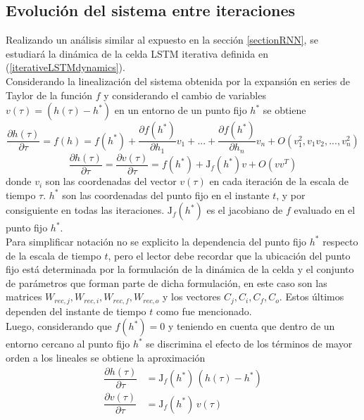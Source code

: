 \documentclass{article}
\begin{document}
	\subsection{Evolución del sistema entre iteraciones}
	Realizando un análisis similar al expuesto en la sección \ref{sectionRNN}, se estudiará la dinámica de la celda LSTM iterativa definida en (\ref{iterativeLSTMdynamics}).\\
	Considerando la linealización del sistema obtenida por la expansión en series de Taylor de la función $f$ y considerando el cambio de variables $v(\tau) = (h(\tau) - h^*)$ en un entorno de un punto fijo $h^*$ se obtiene
	\begin{equation*}
	\dfrac{\partial h(\tau)}{\partial \tau} = f(h) = f(h^*) + \dfrac{\partial f(h^*)}{\partial h_1} v_1+ ... + \dfrac{\partial f(h^*)}{\partial h_n} v_n + O(v_1^2, v_1 v_2, ... , v_n^2)
	\end{equation*}
	\begin{equation*}
	\dfrac{\partial h(\tau)}{\partial \tau} = \dfrac{\partial v(\tau)}{\partial \tau} = f(h^*) + \mathrm{J}_f(h^*) v + O(vv^T)
	\end{equation*}
	donde $v_i$ son las coordenadas del vector $v(\tau)$ en cada iteración de la escala de tiempo $\tau$. $h^*$ son las coordenadas del punto fijo en el instante $t$, y por consiguiente en todas las iteraciones. $\mathrm{J}_f(h^*)$ es el jacobiano de $f$ evaluado en el punto fijo $h^*$. \\
	Para simplificar notación no se explicito la dependencia del punto fijo $h^*$ respecto de la escala de tiempo $t$, pero el lector debe recordar que la ubicación del punto fijo está determinada por la formulación de la dinámica de la celda y el conjunto de parámetros que forman parte de dicha formulación, en este caso son las matrices  $W_{rec, j}, W_{rec, i}, W_{rec, f}, W_{rec, o}$ y los vectores $C_j, C_i, C_f, C_o$. Estos últimos dependen del instante de tiempo $t$ como fue mencionado.\\
	
	Luego, considerando que $f(h^*) = 0$ y teniendo en cuenta que dentro de un entorno cercano al punto fijo $h^*$ se discrimina el efecto de los términos de mayor orden a los lineales se obtiene la aproximación
	\begin{equation}\label{linearDynamics}
	\begin{split}
	\dfrac{\partial h(\tau)}{\partial \tau} &= \mathrm{J}_f(h^*) \, (h(\tau) - h^*)\\
	\dfrac{\partial v(\tau)}{\partial \tau} &= \mathrm{J}_f(h^*) \,v(\tau) 
	\end{split}
	\end{equation}
	
\end{document}
